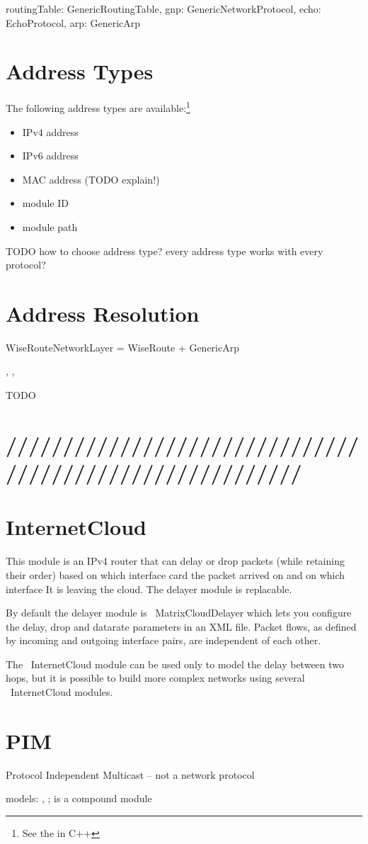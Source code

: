 routingTable: GenericRoutingTable,
gnp: GenericNetworkProtocol,
echo: EchoProtocol,
arp: GenericArp


\section{Address Types}

The following address types are available:\footnote{See the  in C++}

\begin{itemize}
  \item IPv4 address
  \item IPv6 address
  \item MAC address  (TODO explain!)
  \item module ID
  \item module path
\end{itemize}

TODO how to choose address type?  every address type works with every protocol?

\section{Address Resolution}

WiseRouteNetworkLayer = WiseRoute + GenericArp

, , 

TODO

\section{/////////////////////////////////////////////////////////}


\section{InternetCloud}

This module is an IPv4 router that can delay or drop packets (while retaining
their order) based on which interface card the packet arrived on and 
on which interface It is leaving the cloud. The delayer module is replacable.

By default the delayer module is ~MatrixCloudDelayer which lets you configure
the delay, drop and datarate parameters in an XML file. Packet flows, as defined
by incoming and outgoing interface pairs, are independent of each other.

The ~InternetCloud module can be used only to model the delay between two hops, but
it is possible to build more complex networks using several ~InternetCloud modules.

\section{PIM}

Protocol Independent Multicast -- not a network protocol 

models: , ;  is a compound module




